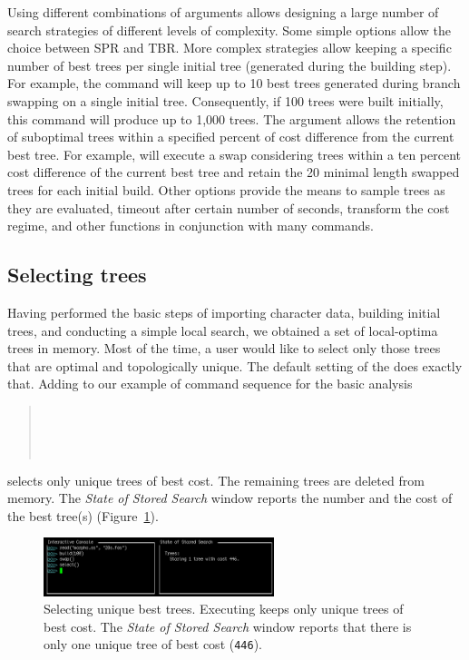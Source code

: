 Using different combinations of  arguments allows designing a  large number of search strategies of different levels of complexity. Some simple options allow the choice between SPR and TBR. More complex strategies allow keeping a specific number of best trees per single initial tree (generated during the building step). For example, the command  will keep up to 10 best trees generated during branch swapping on a single initial tree. Consequently, if 100 trees were built initially, this command will produce up to 1,000 trees. The argument  allows the retention of suboptimal trees within a specified percent of cost difference from the current best tree. For example,  will execute a swap considering trees within a ten percent cost difference of the current best tree and retain the 20 minimal length swapped trees for each initial build. Other options provide the means to sample trees as they are evaluated, timeout after certain number of seconds, transform the cost regime, and other functions in conjunction with many \poy commands.

\subsection{Selecting trees}

Having performed the basic steps of importing character data, building initial trees, and conducting a simple local search, we obtained a set of local-optima trees in memory. Most of the time, a user would like to select only those trees that are optimal and topologically unique. The default setting of the  does exactly that. Adding  to our example of command sequence for the basic analysis 
\begin{quote}
 	\\
 	\\
	\\
\end{quote}
selects only unique trees of best cost. The remaining trees are deleted from memory. The \emph{State of Stored Search} window reports the number and the cost of the best tree(s) (Figure~\ref{fig:select}).

\begin{figure}[]
    \begin{center}
        \includegraphics[width=0.6\textwidth]{doc/figures/select.jpg}
    \end{center}
    \caption{Selecting unique best trees. Executing  keeps only unique trees of best cost. The \emph{State of Stored Search} window reports that there is only one unique tree of best cost (\texttt{446}).}
    \label{fig:select}
\end{figure}


